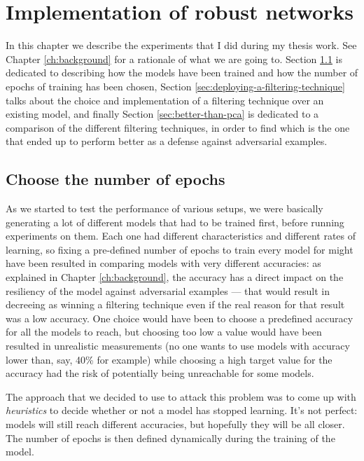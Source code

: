 \chapter{Implementation of robust networks}
\label{ch:implementation-of-robust-networks}

In this chapter we describe the experiments that I did during my thesis
work. See Chapter \ref{ch:background} for a rationale of what we are
going to. Section \ref{sec:choose-the-number-of-epochs} is dedicated to describing
how the models have been trained and how the number of epochs of
training has been chosen, Section
\ref{sec:deploying-a-filtering-technique} talks about the choice and
implementation of a filtering technique over an existing model, and
finally Section \ref{sec:better-than-pca} is dedicated to a comparison
of the different filtering techniques, in order to find which is the
one that ended up to perform better as a defense against adversarial
examples.

\section{Choose the number of epochs}
\label{sec:choose-the-number-of-epochs}

As we started to test the performance of various setups, we were
basically generating a lot of different models that had to be trained
first, before running experiments on them. Each one had different
characteristics and different rates of learning, so fixing a
pre-defined number of epochs to train every model for might have been
resulted in comparing models with very different accuracies: as
explained in Chapter \ref{ch:background}, the accuracy has a direct
impact on the resiliency of the model against adversarial examples ---
that would result in decreeing as winning a filtering technique even if
the real reason for that result was a low accuracy. One choice would
have been to choose a predefined accuracy for all the models to reach,
but choosing too low a value would have been resulted in unrealistic
measurements (no one wants to use models with accuracy lower than, say,
40\% for example) while choosing a high target value for the accuracy had the
risk of potentially being unreachable for some models.

The approach that we decided to use to attack this problem was to come
up with \emph{heuristics} to decide whether or not a model has stopped
learning. It's not perfect: models will still reach different
accuracies, but hopefully they will be all closer. The number of epochs
is then defined dynamically during the training of the model.

